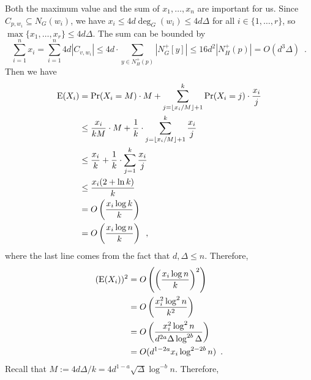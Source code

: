 \documentclass{patmorin}
\begin{document}
Both the maximum value and the sum of $x_1,\ldots,x_n$ are important for us.  Since $C_{p,w_i}\subseteq N_G(w_i)$, we have $x_i\le 4d\deg_G(w_i)\le 4d\Delta$ for all $i\in\{1,\ldots,r\}$, so $\max\{x_1,\ldots,x_r\}\le 4d\Delta$. The sum can be bounded by
\[
  \sum_{i=1}^n x_i
    = \sum_{i=1}^n 4d|C_{v,w_i}|
    \le 4d\cdot \sum_{y\in N^+_{H}(p)} |N^+_G[y]|
    \le 16d^2|N^+_{H}(p)|=O(d^3\Delta)
  \enspace .
\]
Then we have
\begin{align*}
  \mathrm{E}(X_i)
  & =\Pr(X_i=M)\cdot M + \sum_{j=\lfloor x_i/M\rfloor+1}^k \Pr(X_i=j)\cdot\frac{x_i}{j} \\
  & \le\frac{x_i}{kM}\cdot M + \frac{1}{k}\cdot\sum_{j=\lfloor x_i/M\rfloor+1}^k \frac{x_i}{j} \\
  & \le\frac{x_i}{k} + \frac{1}{k}\cdot\sum_{j=1}^k \frac{x_i}{j} \\
  & \le \frac{x_i(2+\ln k)}{k} \\
  & = O\left(\frac{x_i\log k}{k}\right) \\
  & = O\left(\frac{x_i\log n}{k}\right)
  \enspace ,
\end{align*}
where the last line comes from the fact that $d,\Delta \le n$.
Therefore,
\begin{align*}
  (\mathrm{E}(X_i))^2
  & = O\left(\left(\frac{x_i\log n}{k}\right)^2\right) \\
  & = O\left(\frac{x_i^2\log^2 n}{k^2}\right) \\
  & = O\left(\frac{x_i^2\log^2 n}{d^{2a}\Delta\log^{2b}\Delta}\right) \\
  & = O(d^{1-2a}x_i\log^{2-2b} n) \enspace .
\end{align*}
Recall that $M:=4d\Delta/k=4d^{1-a}\sqrt{\Delta}\log^{-b}n$. Therefore,
\end{document}
